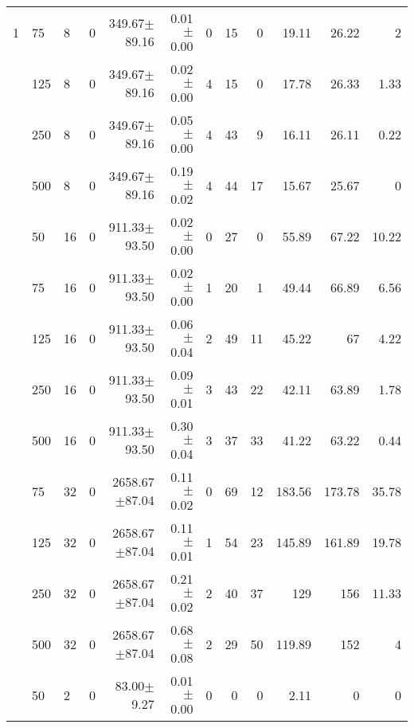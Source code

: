 \documentclass[conference]{IEEEtran}
\begin{document}
\begin{table*}[h]
\begin{center}
\begin{tabular}{c l l c r r r r r r r r}
1&75      &  8   &    0  &  349.67$\pm$89.16    &        0.01$\pm$0.00  &  0  &          15  &            0   &         19.11   &       26.22   &  2       \\
 &125     &  8   &    0  &  349.67$\pm$89.16    &        0.02$\pm$0.00  &  4  &          15  &            0   &         17.78   &       26.33   &  1.33    \\
 &250     &  8   &    0  &  349.67$\pm$89.16    &        0.05$\pm$0.00  &  4  &          43  &            9   &         16.11   &       26.11   &  0.22    \\
 &500     &  8   &    0  &  349.67$\pm$89.16    &        0.19$\pm$0.02  &  4  &          44  &            17  &         15.67   &       25.67   &  0       \\
 &50      &  16  &    0  &  911.33$\pm$93.50    &        0.02$\pm$0.00  &  0  &          27  &            0   &         55.89   &       67.22   &  10.22   \\
 &75      &  16  &    0  &  911.33$\pm$93.50    &        0.02$\pm$0.00  &  1  &          20  &            1   &         49.44   &       66.89   &  6.56    \\
 &125     &  16  &    0  &  911.33$\pm$93.50    &        0.06$\pm$0.04  &  2  &          49  &            11  &         45.22   &       67      &  4.22    \\
 &250     &  16  &    0  &  911.33$\pm$93.50    &        0.09$\pm$0.01  &  3  &          43  &            22  &         42.11   &       63.89   &  1.78    \\
 &500     &  16  &    0  &  911.33$\pm$93.50    &        0.30$\pm$0.04  &  3  &          37  &            33  &         41.22   &       63.22   &  0.44    \\
 &75      &  32  &    0  &  2658.67$\pm$87.04   &        0.11$\pm$0.02  &  0  &          69  &            12  &         183.56  &       173.78  &  35.78   \\
 &125     &  32  &    0  &  2658.67$\pm$87.04   &        0.11$\pm$0.01  &  1  &          54  &            23  &         145.89  &       161.89  &  19.78   \\
 &250     &  32  &    0  &  2658.67$\pm$87.04   &        0.21$\pm$0.02  &  2  &          40  &            37  &         129     &       156     &  11.33   \\
 &500     &  32  &    0  &  2658.67$\pm$87.04   &        0.68$\pm$0.08  &  2  &          29  &            50  &         119.89  &       152     &  4       \\
 \hline
 &50      &  2   &    0  &  83.00$\pm$9.27      &        0.01$\pm$0.00  &  0  &          0   &            0   &         2.11    &       0       &  0       \\

\end{tabular}
\end{center}
\end{table*}
\end{document}
